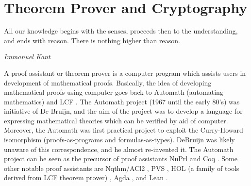 \chapter{Theorem Prover and Cryptography}
\label{cha:theorem_crypto}
 

\epigraph{All our knowledge begins with the senses, proceeds then to the understanding, and
 ends with reason. There is nothing higher than reason.} 
{\textit{Immanuel Kant}} 

A proof assistant or theorem prover is a computer program which assists users in development 
of mathematical proofs. Basically, the idea of 
developing mathematical proofs using computer goes back to Automath (automating mathematics)
\citep{deBruijn1983} and LCF \citep{Milner:1972:IAS:942578.807067}. The 
Automath project (1967 until the early 80's)  was initiative of De Bruijn, and the aim of the project was to 
develop a language for expressing mathematical theories which can be verified by aid of computer.  
Moreover, the Automath was first 
practical project to exploit the Curry-Howard isomorphism (proofs-as-programs and formulas-as-types). 
DeBruijn  was likely unaware of this correspondence, and he almost re-invented it.
The Automath project can be seen as the precursor of
 proof assistants NuPrl \citep{Constable:1986:IMN:10510} and Coq \citep{Bertot:2004:ITP}.  
 Some other notable  proof assistants are 
 Nqthm/ACl2 \citep{507872}, PVS \citep{Owre:1992:PPV:648230.752639},
 HOL (a family of tools derived from LCF theorem prover) \citep{Slind:2008:BOH:1459784.1459792}
 \citep{Harrison:1996:HLT:646184.682934} \citep{Nipkow:2002:IHP},
 Agda \citep{Norell:2008:DTP:1813347.1813352}, and Lean \citep{10.1007/978-3-319-21401-6_26}.


